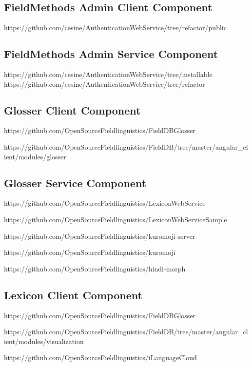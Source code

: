 \documentclass[12pt]{article}
\begin{document}
\subsection{FieldMethods Admin Client Component}

https://github.com/cesine/AuthenticationWebService/tree/refactor/public

\subsection{FieldMethods Admin Service Component}

https://github.com/cesine/AuthenticationWebService/tree/installable
https://github.com/cesine/AuthenticationWebService/tree/refactor

\subsection{Glosser Client Component}

https://github.com/OpenSourceFieldlinguistics/FieldDBGlosser

https://github.com/OpenSourceFieldlinguistics/FieldDB/tree/master/angular\_client/modules/glosser

\subsection{Glosser Service Component}

https://github.com/OpenSourceFieldlinguistics/LexiconWebService

https://github.com/OpenSourceFieldlinguistics/LexiconWebServiceSample


https://github.com/OpenSourceFieldlinguistics/kuromoji-server

https://github.com/OpenSourceFieldlinguistics/kuromoji

https://github.com/OpenSourceFieldlinguistics/hindi-morph

\subsection{Lexicon Client Component}

https://github.com/OpenSourceFieldlinguistics/FieldDBGlosser

https://github.com/OpenSourceFieldlinguistics/FieldDB/tree/master/angular\_client/modules/visualization

https://github.com/OpenSourceFieldlinguistics/iLanguageCloud
\end{document}

